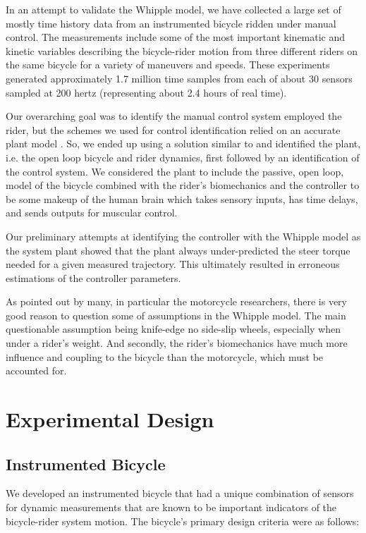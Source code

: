 \documentclass[a4paper]{article}
\begin{document}

In an attempt to validate the Whipple model, we have collected a large set of
mostly time history data from an instrumented bicycle ridden under manual
control. The measurements include some of the most important kinematic and
kinetic variables describing the bicycle-rider motion from three different
riders on the same bicycle for a variety of maneuvers and speeds. These
experiments generated approximately 1.7 million time samples from each of about
30 sensors sampled at 200 hertz (representing about 2.4 hours of real time).

Our overarching goal was to identify the manual control system employed the
rider, but the schemes we used for control identification relied on an accurate
plant model \cite{Moore2012}. So, we ended up using a solution similar to
\cite{Eaton1973} and identified the plant, i.e. the open loop bicycle and rider
dynamics, first followed by an identification of the control system. We
considered the plant to include the passive, open loop, model of the bicycle
combined with the rider's biomechanics and the controller to be some makeup of
the human brain which takes sensory inputs, has time delays, and sends outputs
for muscular control.

Our preliminary attempts at identifying the controller with the Whipple model
as the system plant showed that the plant always under-predicted the steer
torque needed for a given measured trajectory. This ultimately resulted in
erroneous estimations of the controller parameters.

As pointed out by many, in particular the motorcycle researchers, there is very
good reason to question some of assumptions in the Whipple model. The main
questionable assumption being knife-edge no side-slip wheels, especially when
under a rider's weight. And secondly, the rider's biomechanics have much more
influence and coupling to the bicycle than the motorcycle, which must be
accounted for.
\section{Experimental Design}

\subsection{Instrumented Bicycle}

We developed an instrumented bicycle that had a unique combination of sensors
for dynamic measurements that are known to be important indicators of the
bicycle-rider system motion. The bicycle's primary design criteria were as
follows:
\end{document}
